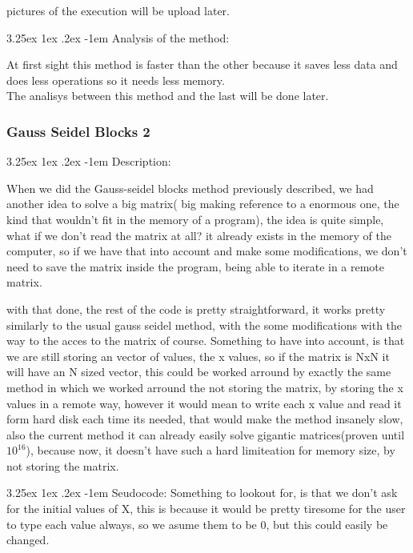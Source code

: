 \documentclass{article}
\makeatletter
\renewcommand\paragraph{\@startsection{paragraph}{5}{\z@}%
  {3.25ex \@plus1ex \@minus.2ex}%
  {-1em}%
  {\normalfont\normalsize\bfseries}}
\makeatother
\begin{document}
pictures of the execution will be upload later.

\paragraph{Analysis of the method:}

\hfill \break
At first sight this method is faster than the other because it saves less data and does less operations so it needs less memory.\\

The analisys between this method and the last will be done later.


\subsubsection{Gauss Seidel Blocks 2}

\paragraph{Description:}
\hfill \break

When we did the Gauss-seidel blocks method previously described, we had another idea to solve a big matrix( big making reference to a 
enormous one, the kind that wouldn't fit in the memory of a program), the idea is quite simple, what if we don't read the matrix at all?
it already exists in the memory of the computer, so if we have that into account and make some modifications, we don't need to save the matrix inside
the program, being able to iterate in a remote matrix.

with that done, the rest of the code is pretty straightforward, it works pretty similarly to the usual gauss seidel method, with the some modifications with the way
to the acces to the matrix of course. Something to have into account, is that we are still storing an vector of values, the x values, so if the matrix is NxN
it will have an N sized vector, this could be worked arround by exactly the same method in which we worked arround the not storing the matrix, by storing the x values in a remote way, however it would mean to
write each x value and read it form hard disk each time its needed, that would make the method insanely slow, also the current method it can already easily solve
gigantic matrices(proven until $10^{16}$), because now, it doesn't have such a hard limiteation for memory size, by not storing the
matrix.

\paragraph{Seudocode:}
\hfill \break
Something to lookout for, is that we don't ask for the initial values of X, this is because it
would be pretty tiresome for the user to type each value always, so we asume them to be 0, but
this could easily be changed.
\end{document}
